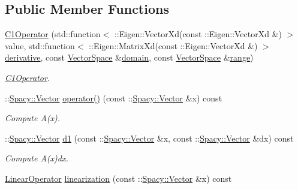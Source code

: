 \subsection*{Public Member Functions}
\begin{DoxyCompactItemize}
\item 
\hyperlink{classSpacy_1_1Rn_1_1C1Operator_ace713dafa8c7422f57f0f1c0a989db12}{C1\+Operator} (std\+::function$<$ \+::Eigen\+::\+Vector\+Xd(const \+::Eigen\+::\+Vector\+Xd \&) $>$ value, std\+::function$<$ \+::Eigen\+::\+Matrix\+Xd(const \+::Eigen\+::\+Vector\+Xd \&) $>$ \hyperlink{namespaceSpacy_a002fe344fa6d04a6ac59a74ea25fddb6}{derivative}, const \hyperlink{classSpacy_1_1VectorSpace}{Vector\+Space} \&\hyperlink{classSpacy_1_1OperatorBase_a2588f9b3e0188820c4c494e63293dc6f}{domain}, const \hyperlink{classSpacy_1_1VectorSpace}{Vector\+Space} \&\hyperlink{classSpacy_1_1OperatorBase_ab19d3b7a6f290b1079248f1e567e53d6}{range})
\begin{DoxyCompactList}\small\item\em \hyperlink{classSpacy_1_1Rn_1_1C1Operator}{C1\+Operator}. \end{DoxyCompactList}\item 
\hypertarget{classSpacy_1_1Rn_1_1C1Operator_a21205efc25688cb7d5f184eeb637df60}{}\+::\hyperlink{classSpacy_1_1Vector}{Spacy\+::\+Vector} \hyperlink{classSpacy_1_1Rn_1_1C1Operator_a21205efc25688cb7d5f184eeb637df60}{operator()} (const \+::\hyperlink{classSpacy_1_1Vector}{Spacy\+::\+Vector} \&x) const \label{classSpacy_1_1Rn_1_1C1Operator_a21205efc25688cb7d5f184eeb637df60}

\begin{DoxyCompactList}\small\item\em Compute A(x). \end{DoxyCompactList}\item 
\hypertarget{classSpacy_1_1Rn_1_1C1Operator_af15f1491a967262ffcfe6d484d440940}{}\+::\hyperlink{classSpacy_1_1Vector}{Spacy\+::\+Vector} \hyperlink{classSpacy_1_1Rn_1_1C1Operator_af15f1491a967262ffcfe6d484d440940}{d1} (const \+::\hyperlink{classSpacy_1_1Vector}{Spacy\+::\+Vector} \&x, const \+::\hyperlink{classSpacy_1_1Vector}{Spacy\+::\+Vector} \&dx) const \label{classSpacy_1_1Rn_1_1C1Operator_af15f1491a967262ffcfe6d484d440940}

\begin{DoxyCompactList}\small\item\em Compute A\textquotesingle{}(x)dx. \end{DoxyCompactList}\item 
\hypertarget{classSpacy_1_1Rn_1_1C1Operator_a507155c1dbf6f312cf4864b509ed84bc}{}\hyperlink{classSpacy_1_1Rn_1_1LinearOperator}{Linear\+Operator} \hyperlink{classSpacy_1_1Rn_1_1C1Operator_a507155c1dbf6f312cf4864b509ed84bc}{linearization} (const \+::\hyperlink{classSpacy_1_1Vector}{Spacy\+::\+Vector} \&x) const \label{classSpacy_1_1Rn_1_1C1Operator_a507155c1dbf6f312cf4864b509ed84bc}


\end{DoxyCompactItemize}
